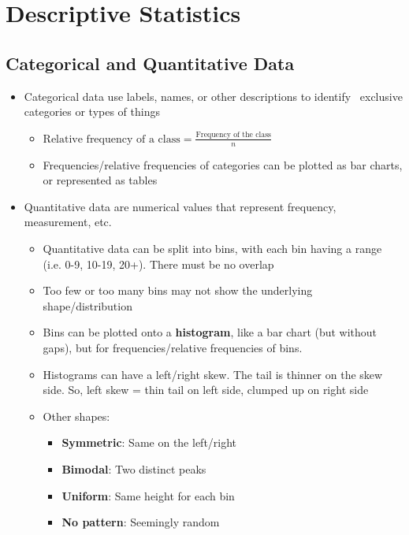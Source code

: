 \documentclass{article}
\begin{document}
\section{Descriptive Statistics}

\subsection{Categorical and Quantitative Data}

\begin{itemize}
    \item Categorical data use labels, names, or other descriptions to identify \ {exclusive} categories or types of things
        \begin{itemize}
            \item $\text{Relative frequency of a class} = \frac{\text{Frequency of the class}}{n}$
            \item Frequencies/relative frequencies of categories can be plotted as bar charts, or represented as tables
        \end{itemize}
    \item Quantitative data are numerical values that represent frequency, measurement, etc.
        \begin{itemize}
            \item Quantitative data can be split into bins, with each bin having a range (i.e. 0-9, 10-19, 20+). There must be no overlap
            \item Too few or too many bins may not show the underlying shape/distribution
            \item Bins can be plotted onto a \textbf{histogram}, like a bar chart (but without gaps), but for frequencies/relative frequencies of bins.
            \item Histograms can have a left/right skew. The tail is thinner on the skew side. So, left skew = thin tail on left side, clumped up on right side
            \item Other shapes:
            \begin{itemize}
                \item \textbf{Symmetric}: Same on the left/right
                \item \textbf{Bimodal}: Two distinct peaks
                \item \textbf{Uniform}: Same height for each bin
                \item \textbf{No pattern}: Seemingly random
            \end{itemize}
        \end{itemize}
\end{itemize}
\end{document}
